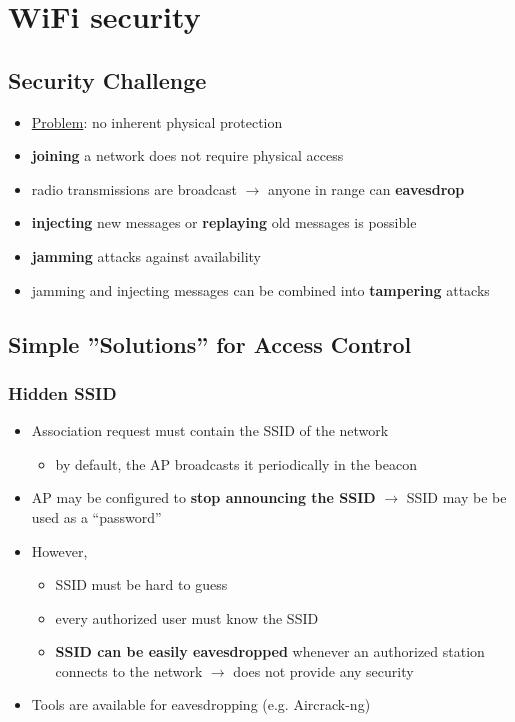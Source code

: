 \documentclass[final]{article}
\begin{document}
\section{WiFi security}
\subsection{Security Challenge}
\begin{itemize}[nosep]
    \item \underline{Problem}: no inherent physical protection
    \item \textbf{joining} a network does not require physical access
    \item radio transmissions are broadcast $\rightarrow$ anyone in range can \textbf{eavesdrop}
    \item \textbf{injecting} new messages or \textbf{replaying} old messages is possible
    \item \textbf{jamming} attacks against availability
    \item jamming and injecting messages can be combined into \textbf{tampering} attacks
\end{itemize}
\subsection{Simple ''Solutions'' for Access Control}
\subsubsection*{Hidden SSID}
\begin{itemize}[nosep]
    \item Association request must contain the SSID of the network
          \begin{itemize}[nosep]
              \item by default, the AP broadcasts it periodically in the beacon
          \end{itemize}
    \item AP may be configured to \textbf{stop announcing the SSID} $\rightarrow$ SSID may be be used as a ``password''
    \item However,
          \begin{itemize}[nosep]
              \item SSID must be hard to guess
              \item every authorized user must know the SSID
              \item \textbf{SSID can be easily eavesdropped} whenever an authorized station connects to the network $\rightarrow$ does not provide any security
          \end{itemize}
    \item Tools are available for eavesdropping (e.g. Aircrack-ng)
\end{itemize}
\end{document}
